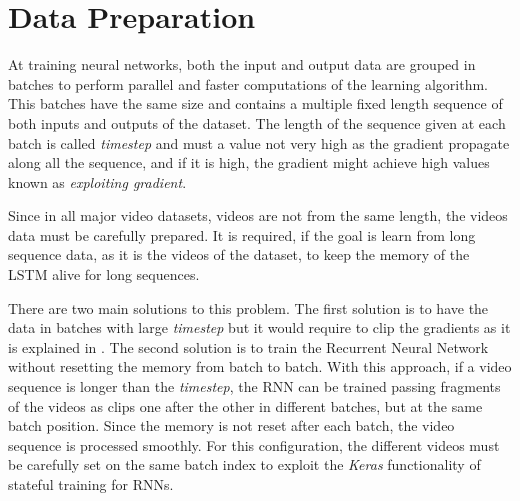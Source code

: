 

\section{Data Preparation}

At training neural networks, both the input and output data are grouped in batches to perform parallel and faster computations of the learning algorithm. This batches have the same size and contains a multiple fixed length sequence of both inputs and outputs of the dataset. The length of the sequence given at each batch is called \textit{timestep} and must a value not very high as the gradient propagate along all the sequence, and if it is high, the gradient might achieve high values known as \textit{exploiting gradient}.

Since in all major video datasets, videos are not from the same length, the videos data must be carefully prepared. It is required, if the goal is learn from long sequence data, as it is the videos of the dataset, to keep the memory of the LSTM alive for long sequences. 



There are two main solutions to this problem. The first solution is to have the data in batches with large \textit{timestep} but it would require to clip the gradients as it is explained in \cite{pascanu2012difficulty}. The second solution is to train the Recurrent Neural Network without resetting the memory from batch to batch. With this approach, if a video sequence is longer than the \textit{timestep}, the RNN can be trained passing fragments of the videos as clips one after the other in different batches, but at the same batch position. Since the memory is not reset after each batch, the video sequence is processed smoothly. For this configuration, the different videos must be carefully set on the same batch index to exploit the \textit{Keras} functionality of stateful training for RNNs.

